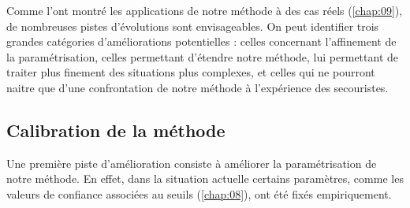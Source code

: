
Comme l'ont montré les applications de notre méthode à des cas réels
(\autoref{chap:09}), de nombreuses pistes d'évolutions sont
envisageables. On peut identifier trois grandes catégories
d'améliorations potentielles : celles concernant l'affinement de la
paramétrisation, celles permettant d'étendre notre méthode, lui
permettant de traiter plus finement des situations plus complexes, et
celles qui ne pourront naitre que d'une confrontation de notre méthode
à l'expérience des secouristes.

\subsection*{Calibration de la méthode}

Une première piste d'amélioration consiste à améliorer la
paramétrisation de notre méthode. En effet, dans la situation actuelle
certains paramètres, comme les valeurs de confiance associées au
seuils (\autoref{chap:08}), ont été fixés empiriquement.


